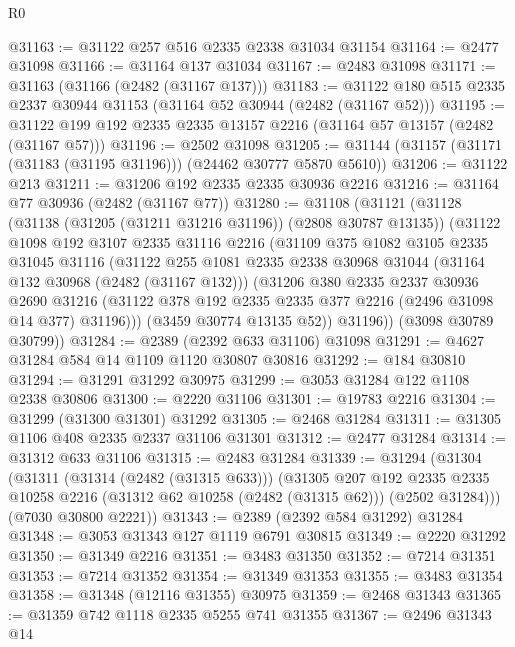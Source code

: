 \begin{lexlean}{R0}
\begin{coremodule}
@31163 := @31122 @257 @516 @2335 @2338 @31034 @31154
@31164 := @2477 @31098
@31166 := @31164 @137 @31034
@31167 := @2483 @31098
@31171 := @31163 (@31166 (@2482 (@31167 @137)))
@31183 := @31122 @180 @515 @2335 @2337 @30944 @31153 (@31164 @52 @30944 (@2482 (@31167 @52)))
@31195 := @31122 @199 @192 @2335 @2335 @13157 @2216 (@31164 @57 @13157 (@2482 (@31167 @57)))
@31196 := @2502 @31098
@31205 := @31144 (@31157 (@31171 (@31183 (@31195 @31196))) (@24462 @30777 @5870 @5610))
@31206 := @31122 @213
@31211 := @31206 @192 @2335 @2335 @30936 @2216
@31216 := @31164 @77 @30936 (@2482 (@31167 @77))
@31280 := @31108
    (@31121
      (@31128
        (@31138 (@31205 (@31211 @31216 @31196)) (@2808 @30787 @13135))
        (@31122
          @1098
          @192
          @3107
          @2335
          @31116
          @2216
          (@31109
            @375
            @1082
            @3105
            @2335
            @31045
            @31116
            (@31122
              @255
              @1081
              @2335
              @2338
              @30968
              @31044
              (@31164 @132 @30968 (@2482 (@31167 @132)))
              (@31206
                @380
                @2335
                @2337
                @30936
                @2690
                @31216
                (@31122 @378 @192 @2335 @2335 @377 @2216 (@2496 @31098 @14 @377) @31196)))
            (@3459 @30774 @13135 @52))
          @31196))
      (@3098 @30789 @30799))
@31284 := @2389 (@2392 @633 @31106) @31098
@31291 := @4627 @31284 @584 @14 @1109 @1120 @30807 @30816
@31292 := @184 @30810
@31294 := @31291 @31292 @30975
@31299 := @3053 @31284 @122 @1108 @2338 @30806
@31300 := @2220 @31106
@31301 := @19783 @2216
@31304 := @31299 (@31300 @31301) @31292
@31305 := @2468 @31284
@31311 := @31305 @1106 @408 @2335 @2337 @31106 @31301
@31312 := @2477 @31284
@31314 := @31312 @633 @31106
@31315 := @2483 @31284
@31339 := @31294
    (@31304
      (@31311
        (@31314 (@2482 (@31315 @633)))
        (@31305
          @207
          @192
          @2335
          @2335
          @10258
          @2216
          (@31312 @62 @10258 (@2482 (@31315 @62)))
          (@2502 @31284)))
      (@7030 @30800 @2221))
@31343 := @2389 (@2392 @584 @31292) @31284
@31348 := @3053 @31343 @127 @1119 @6791 @30815
@31349 := @2220 @31292
@31350 := @31349 @2216
@31351 := @3483 @31350
@31352 := @7214 @31351
@31353 := @7214 @31352
@31354 := @31349 @31353
@31355 := @3483 @31354
@31358 := @31348 (@12116 @31355) @30975
@31359 := @2468 @31343
@31365 := @31359 @742 @1118 @2335 @5255 @741 @31355
@31367 := @2496 @31343 @14

\end{coremodule}
\end{lexlean}
